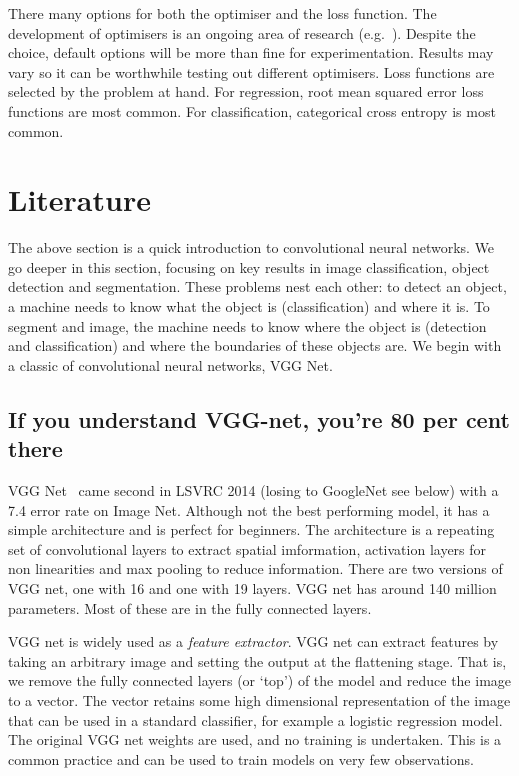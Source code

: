 \documentclass[12pt, a4paper, oneside, headinclude, footinclude]{article}
\begin{document}
There many options for both the optimiser and the loss function. The
development of optimisers is an ongoing area of research
(e.g.~\cite{wilson2017marginal}). Despite the choice, default options will be
more than fine for experimentation. Results may vary so it can be worthwhile
testing out different optimisers. Loss functions are selected by the problem
at hand. For regression, root mean squared error loss functions are most
common. For classification, categorical cross entropy is most common. 

\section{Literature}

The above section is a quick introduction to convolutional neural networks. We
go deeper in this section, focusing on key results in image classification,
object detection and segmentation. These problems nest each other: to detect
an object, a machine needs to know what the object is (classification) and
where it is. To segment and image, the machine needs to know where the object
is (detection and classification) and where the boundaries of these objects
are. We begin with a classic of convolutional neural networks, VGG Net.


\subsection{If you understand VGG-net, you're 80 per cent there}

VGG Net~\cite{SimonyanZ14a} came second in LSVRC 2014 (losing to GoogleNet see
below) with a 7.4 error rate on Image Net. Although not the best performing
model, it has a simple architecture and is perfect for beginners. The
architecture is a repeating set of convolutional layers to extract spatial
imformation, activation layers for non linearities and max pooling to reduce
information. There are two versions of VGG net, one with 16 and one with 19
layers. VGG net has around 140 million parameters. Most of these are in the
fully connected layers. 

VGG net is widely used as a \textit{feature extractor}. VGG net can extract
features by taking an arbitrary image and setting the output at the flattening
stage. That is, we remove the fully connected layers (or `top') of the model
and reduce the image to a vector. The vector retains some high dimensional
representation of the image that can be used in a standard classifier, for
example a logistic regression model. The original VGG net weights are used,
and no training is undertaken. This is a common practice and can be used to
train models on very few observations.
\end{document}
